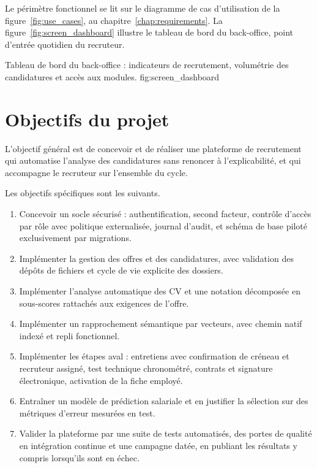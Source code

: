 Le périmètre fonctionnel se lit sur le diagramme de cas d'utilisation de la
figure~\ref{fig:use_cases}, au chapitre~\ref{chap:requirements}. La
figure~\ref{fig:screen_dashboard} illustre le tableau de bord du back-office,
point d'entrée quotidien du recruteur.

  {Tableau de bord du back-office : indicateurs de recrutement, volumétrie des
   candidatures et accès aux modules.}
  {fig:screen_dashboard}

\section{Objectifs du projet}
\label{sec:objectives}

L'objectif général est de concevoir et de réaliser une plateforme de
recrutement qui automatise l'analyse des candidatures sans renoncer à
l'explicabilité, et qui accompagne le recruteur sur l'ensemble du cycle.

Les objectifs spécifiques sont les suivants.

\begin{enumerate}[leftmargin=*]
  \item Concevoir un socle sécurisé : authentification, second facteur,
        contrôle d'accès par rôle avec politique externalisée, journal
        d'audit, et schéma de base piloté exclusivement par migrations.
  \item Implémenter la gestion des offres et des candidatures, avec validation
        des dépôts de fichiers et cycle de vie explicite des dossiers.
  \item Implémenter l'analyse automatique des CV et une notation décomposée
        en sous-scores rattachés aux exigences de l'offre.
  \item Implémenter un rapprochement sémantique par vecteurs, avec chemin
        natif indexé et repli fonctionnel.
  \item Implémenter les étapes aval : entretiens avec confirmation de créneau
        et recruteur assigné, test technique chronométré, contrats et
        signature électronique, activation de la fiche employé.
  \item Entraîner un modèle de prédiction salariale et en justifier la
        sélection sur des métriques d'erreur mesurées en test.
  \item Valider la plateforme par une suite de tests automatisés, des portes
        de qualité en intégration continue et une campagne datée, en publiant
        les résultats y compris lorsqu'ils sont en échec.
\end{enumerate}

